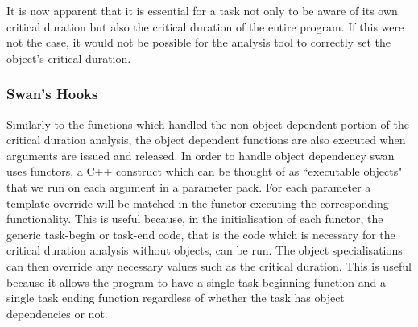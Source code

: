 It is now apparent that it is essential for a task not only to be aware of its own critical duration but also the critical duration of the entire program. If this were not the case, it would not be possible for the analysis tool to correctly set the object's critical duration. 

\subsubsection{Swan's Hooks}

Similarly to the functions which handled the non-object dependent portion of the critical duration analysis, the object dependent functions are also executed when arguments are issued and released. In order to handle object dependency swan uses functors, a C++ construct which can be thought of as ``executable objects" that we run on each argument in a parameter pack. For each parameter a template override will be matched in the functor executing the corresponding functionality. This is useful because, in the initialisation of each functor, the generic task-begin or task-end code, that is the code which is necessary for the critical duration analysis without objects, can be run. The object specialisations can then override any necessary values such as the critical duration. This is useful because it allows the program to have a single task beginning function and a single task ending function regardless of whether the task has object dependencies or not.
